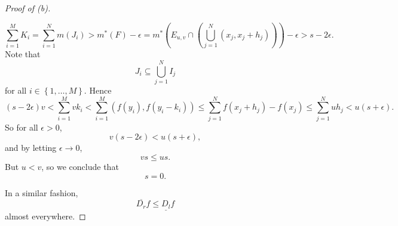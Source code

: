 \documentclass[pmath451]{subfiles}
\begin{document}
\begin{proof}[Proof of (b)]
\begin{claim}
            \begin{equation*}
                \sum^{M}_{i=1}K_i = \sum^{N}_{i=1} m\left( J_i \right) > m^{*}\left( F \right)-\epsilon = m^{*}\left( E_{u,v}\cap\left( \bigcup^{N}_{j=1}\left( x_j,x_j+h_j \right) \right) \right)-\epsilon > s-2\epsilon.
            \end{equation*}
            Note that
            \begin{equation*}
                J_i \subseteq \bigcup^{N}_{j=1}I_j
            \end{equation*}
            for all $i\in\left\lbrace 1,\ldots,M \right\rbrace$. Hence
            \begin{equation*}
                \left( s-2\epsilon \right) v < \sum^{M}_{i=1}vk_i < \sum^{M}_{i=1} \left( f\left( y_i \right),f\left( y_i-k_i \right) \right) \leq \sum^{N}_{j=1} f\left( x_j+h_j \right)-f\left( x_j \right) \leq \sum^{N}_{j=1} uh_j < u\left( s+\epsilon \right).
            \end{equation*}
            So for all $\epsilon>0$,
            \begin{equation*}
                v\left( s-2\epsilon \right) < u\left( s+\epsilon \right),
            \end{equation*}
            and by letting $\epsilon\to 0$,
            \begin{equation*}
                vs\leq us.
            \end{equation*}
            But $u<v$, so we conclude that
            \begin{equation*}
                s = 0.
            \end{equation*}
        \end{claim}

        In a similar fashion,
        \begin{equation*}
            \overline{D_r}f\leq \underline{D_l}f
        \end{equation*}
        almost everywhere.
    \end{proof}
\end{document}
